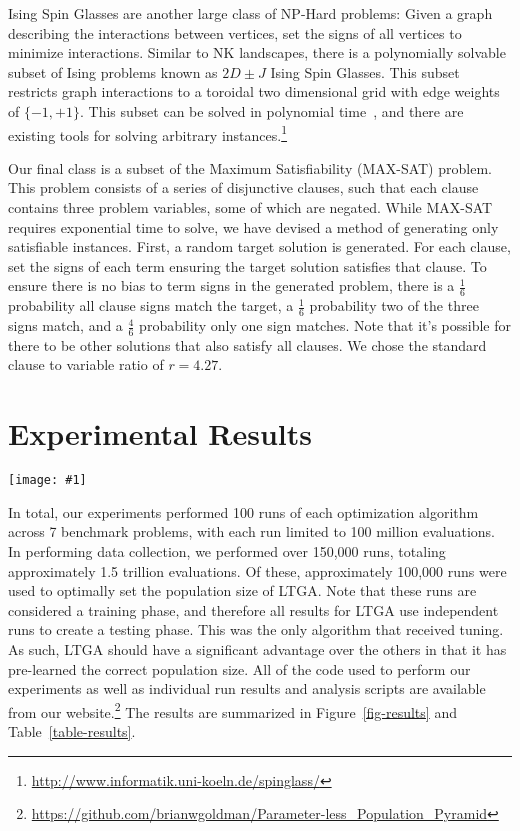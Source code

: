 \documentclass{sig-alternate}
\newcommand{\includegraphicswide}[1]
{\texttt{[image: \#1]}}
\begin{document}
Ising Spin Glasses are another large class of NP-Hard problems: Given a graph
describing the interactions between vertices, set the signs of all vertices to minimize
interactions.
Similar to NK landscapes, there is a polynomially solvable subset of Ising problems
known as $2D\pm J$ Ising Spin Glasses.  This subset restricts graph interactions to a
toroidal two dimensional grid with edge weights of $\{-1, +1\}$.  This subset can
be solved in polynomial time~\cite{saul:1994:spinglass}, and there are existing
tools for solving arbitrary instances.\footnote{\url{http://www.informatik.uni-koeln.de/spinglass/}}

Our final class is a subset of the Maximum Satisfiability (MAX-SAT) problem.
This problem consists of a series of disjunctive clauses, such that each clause contains
three problem variables, some of which are negated. While
MAX-SAT requires exponential time to solve, we have devised a method of generating
only satisfiable instances.
First, a random target solution is generated.  For each clause, set the signs of each
term ensuring the target solution satisfies that clause.
To ensure there is no bias to term signs in the generated problem, there is a $\frac{1}{6}$ probability
all clause signs match the target, a $\frac{1}{6}$ probability two of the three signs match,
and a $\frac{4}{6}$ probability only one sign matches.  Note that it's possible for there to be
other solutions that also satisfy all clauses.  We chose the standard clause to variable ratio
of $r=4.27$.

\section{Experimental Results}
\begin{figure*}
  \centering
  \includegraphicswide{WithRast}
  \caption{Comparison of the median number of evaluations to reach the global optimum for
           the four different optimization methods with respect
           to problem size.  If the median run did not reach the global optimum no data element
           is shown.  Results given on a log-log scale.}
  \label{fig-results}
\end{figure*}

In total, our experiments performed 100 runs of each optimization algorithm across
7 benchmark problems, with each run limited to 100 million evaluations.
In performing data collection, we performed over 150,000 runs, totaling approximately
1.5 trillion evaluations.  Of these, approximately 100,000 runs were used to optimally
set the population size of LTGA.  Note that these runs are considered a training phase,
and therefore all results for LTGA use independent runs to create a testing phase.
This was the only algorithm that received tuning.  As such, LTGA should have a significant
advantage over the others in that it has pre-learned the correct population size.
All of the code used to perform our experiments
as well as individual run results and analysis scripts are available from our
website.\footnote{\url{https://github.com/brianwgoldman/Parameter-less_Population_Pyramid}}  The results
are summarized in Figure~\ref{fig-results} and Table~\ref{table-results}.
\end{document}

